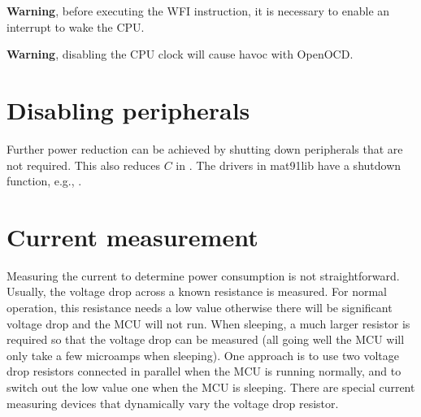\textbf{Warning}, before executing the WFI instruction, it is necessary
to enable an interrupt to wake the CPU.

\textbf{Warning}, disabling the CPU clock will cause havoc with
OpenOCD.


\section{Disabling peripherals}

Further power reduction can be achieved by shutting down peripherals
that are not required.  This also reduces $C$ in .  The
drivers in mat91lib have a shutdown function, e.g., .



\section{Current measurement}

Measuring the current to determine power consumption is not
straightforward.  Usually, the voltage drop across a known resistance
is measured.  For normal operation, this resistance needs a low value
otherwise there will be significant voltage drop and the MCU will not
run.  When sleeping, a much larger resistor is required so that the
voltage drop can be measured (all going well the MCU will only take a
few microamps when sleeping).  One approach is to use two voltage drop
resistors connected in parallel when the MCU is running normally, and
to switch out the low value one when the MCU is sleeping.  There are
special current measuring devices that dynamically vary the voltage
drop resistor.
